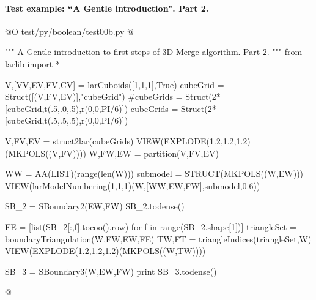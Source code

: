 \documentclass[11pt,oneside]{article}    %
\begin{document}
\paragraph{Test example: ``A Gentle introduction". Part 2.}
@O test/py/boolean/test00b.py
@{""" A Gentle introduction to first steps of 3D Merge algorithm. Part 2. """
from larlib import *

V,[VV,EV,FV,CV] = larCuboids([1,1,1],True)
cubeGrid = Struct([(V,FV,EV)],"cubeGrid")
#cubeGrids = Struct(2*[cubeGrid,t(.5,.0,.5),r(0,0,PI/6)])
cubeGrids = Struct(2*[cubeGrid,t(.5,.5,.5),r(0,0,PI/6)])

V,FV,EV = struct2lar(cubeGrids)
VIEW(EXPLODE(1.2,1.2,1.2)(MKPOLS((V,FV))))
W,FW,EW = partition(V,FV,EV)

WW = AA(LIST)(range(len(W)))
submodel = STRUCT(MKPOLS((W,EW)))
VIEW(larModelNumbering(1,1,1)(W,[WW,EW,FW],submodel,0.6)) 

SB_2 = SBoundary2(EW,FW)
SB_2.todense()

FE = [list(SB_2[:,f].tocoo().row) for f in range(SB_2.shape[1])]
triangleSet = boundaryTriangulation(W,FW,EW,FE)
TW,FT = triangleIndices(triangleSet,W)
VIEW(EXPLODE(1.2,1.2,1.2)(MKPOLS((W,TW))))

SB_3 = SBoundary3(W,EW,FW)
print SB_3.todense()

@}




\end{document}
